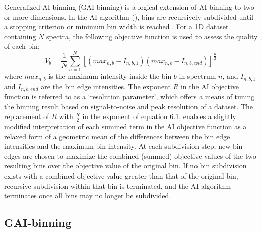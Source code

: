 \begin{doublespace}
Generalized AI-binning (GAI-binning) is a logical extension of AI-binning to
two or more dimensions. In the AI algorithm (), bins
are recursively subdivided until a stopping criterion or minimum bin width is
reached \cite{demeyer:anchem2008}. For a 1D dataset containing $N$ spectra,
the following objective function is used to assess the quality of each bin:
\begin{equation}
V_b = \frac{1}{N}
  \sum_{n=1}^N \left[
    (max_{n,b} - I_{n,b,1})
    (max_{n,b} - I_{n,b,end}) \right]^\frac{R}{2}
\end{equation}
where $max_{n,b}$ is the maximum intensity inside the bin $b$ in spectrum $n$,
and $I_{n,b,1}$ and $I_{n,b,end}$ are the bin edge intensities. The exponent
$R$ in the AI objective function is referred to as a `resolution parameter',
which offers a means of tuning the binning result based on signal-to-noise and
peak resolution of a dataset. The replacement of $R$ with $\frac{R}{2}$ in the
exponent of equation 6.1, enables a slightly modified interpretation of each
summed term in the AI objective function as a relaxed form of a geometric mean
of the differences between the bin edge intensities and the maximum bin
intensity. At each subdivision step, new bin edges are chosen to maximize the
combined (summed) objective values of the two resulting bins over the objective
value of the original bin. If no bin subdivision exists with a combined
objective value greater than that of the original bin, recursive subdivision
within that bin is terminated, and the AI algorithm terminates once all bins
may no longer be subdivided.
\end{doublespace}

\subsection{GAI-binning}

